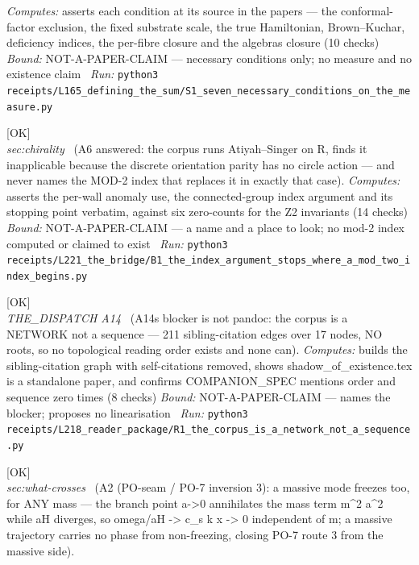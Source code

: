 \begin{description}
\emph{Computes:} asserts each condition at its source in the papers --- the conformal-factor exclusion, the fixed substrate scale, the true Hamiltonian, Brown--Kuchar, deficiency indices, the per-fibre closure and the algebras closure (10 checks)
 \emph{Bound:} NOT-A-PAPER-CLAIM --- necessary conditions only; no measure and no existence claim
\ \emph{Run:} \texttt{python3 receipts/L165\_defining\_the\_sum/S1\_seven\_necessary\_conditions\_on\_the\_measure.py}
\item[\label{rcpt:B1_the_index_argument_stops_where_a_mod_two_index_begins}\texttt{B1\_the\_index\_argument\_stops\_where\_a\_mod\_two\_index\_begins}]\hfill\textsf{[OK]}\\
\textit{sec:chirality} \ (A6 answered: the corpus runs Atiyah--Singer on R, finds it inapplicable because the discrete orientation parity has no circle action --- and never names the MOD-2 index that replaces it in exactly that case). 
\emph{Computes:} asserts the per-wall anomaly use, the connected-group index argument and its stopping point verbatim, against six zero-counts for the Z2 invariants (14 checks)
 \emph{Bound:} NOT-A-PAPER-CLAIM --- a name and a place to look; no mod-2 index computed or claimed to exist
\ \emph{Run:} \texttt{python3 receipts/L221\_the\_bridge/B1\_the\_index\_argument\_stops\_where\_a\_mod\_two\_index\_begins.py}
\item[\label{rcpt:R1_the_corpus_is_a_network_not_a_sequence}\texttt{R1\_the\_corpus\_is\_a\_network\_not\_a\_sequence}]\hfill\textsf{[OK]}\\
\textit{THE\_DISPATCH A14} \ (A14s blocker is not pandoc: the corpus is a NETWORK not a sequence --- 211 sibling-citation edges over 17 nodes, NO roots, so no topological reading order exists and none can). 
\emph{Computes:} builds the sibling-citation graph with self-citations removed, shows shadow\_of\_existence.tex is a standalone paper, and confirms COMPANION\_SPEC mentions order and sequence zero times (8 checks)
 \emph{Bound:} NOT-A-PAPER-CLAIM --- names the blocker; proposes no linearisation
\ \emph{Run:} \texttt{python3 receipts/L218\_reader\_package/R1\_the\_corpus\_is\_a\_network\_not\_a\_sequence.py}
\item[\label{rcpt:S1_a_massive_mode_freezes_too_and_the_mass_term_vanishes_at_the_branch_point}\texttt{S1\_a\_massive\_mode\_freezes\_too\_and\_the\_mass\_term\_vanishes\_at\_the\_branch\_point}]\hfill\textsf{[OK]}\\
\textit{sec:what-crosses} \ (A2 (PO-seam / PO-7 inversion 3): a massive mode freezes too, for ANY mass --- the branch point a->0 annihilates the mass term m\textasciicircum{}2 a\textasciicircum{}2 while \textbar{}aH\textbar{} diverges, so omega/\textbar{}aH\textbar{} -> c\_s k x -> 0 independent of m; a massive trajectory carries no phase from non-freezing, closing PO-7 route 3 from the massive side). 

\end{description}
